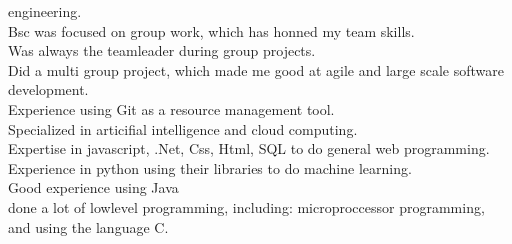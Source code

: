engineering.\\Bsc was focused on group work, which has honned my team skills.\\Was always the teamleader during group projects.\\Did a multi group project, which made me good at agile and large scale software development.\\Experience using Git as a resource management tool.\\Specialized in articifial intelligence and cloud computing.\\Expertise in javascript, .Net, Css, Html, SQL to do general web programming.\\Experience in python using their libraries to do machine learning.\\Good experience using Java\\done a lot of lowlevel programming, including: microproccessor programming, and using the language C.\\
